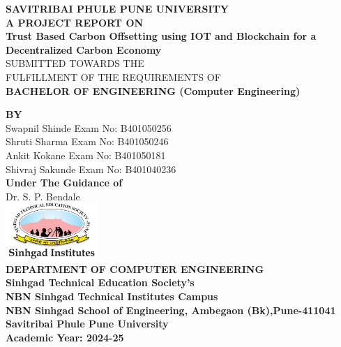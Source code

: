\documentclass[oneside,a4paper,12pt]{book}
\begin{document}
\setlength{\parindent}{0mm}
\begin{center}
{\bfseries SAVITRIBAI PHULE PUNE UNIVERSITY \\}
 \vspace*{1\baselineskip}
{\bfseries A  PROJECT REPORT ON \\}
 \vspace*{2\baselineskip}
{\bfseries \fontsize{12}{12} \selectfont  Trust Based Carbon Offsetting using IOT and Blockchain for a Decentralized Carbon Economy \\ \vspace*{2\baselineskip}}
{\fontsize{12}{12} \selectfont SUBMITTED TOWARDS THE
 \\FULFILLMENT OF THE REQUIREMENTS OF \\

\vspace*{2\baselineskip}}
{\bfseries \fontsize{12}{12} \selectfont BACHELOR OF ENGINEERING (Computer
Engineering) \\}

{\bfseries \fontsize{12}{12} \selectfont BY \\ 
\vspace*{1\baselineskip}} 
Swapnil Shinde \hspace{10 mm}   Exam No: B401050256  \\
Shruti Sharma \hspace{10 mm} Exam No: B401050246 \\
Ankit Kokane \hspace{10 mm} Exam No: B401050181  \\
Shivraj Sakunde \hspace{10 mm} Exam No: B401040236  \\
\vspace*{1.5\baselineskip}
{\bfseries \fontsize{14}{12} \selectfont Under The Guidance of \\  
\vspace*{1\baselineskip}} 
Dr. S. P. Bendale\\
\vspace*{1\baselineskip}
\includegraphics[width=100pt]{Logo-1606151851.jpg} \\

\centering
{\bfseries \fontsize{14}{12} \selectfont DEPARTMENT OF COMPUTER ENGINEERING }\\
\centering
{\bfseries \fontsize{11}{11} \selectfont
Sinhgad Technical Education Society's} \\
\centering
{\bfseries \fontsize{14}{12} \selectfont
NBN Sinhgad Technical Institutes Campus \\
NBN Sinhgad School of Engineering, Ambegaon (Bk),Pune-411041\\
Savitribai Phule Pune University \\
Academic Year: 2024-25
}
\end{center}
\end{document}
